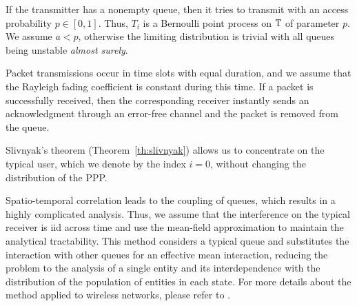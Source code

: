 If the transmitter has a nonempty queue, then it tries to transmit with an access probability $p\in[0,1]$. Thus, $T_i$ is a Bernoulli point process on ${\mathbb T}$ of parameter $p$.
%
We assume $a < p$, otherwise the limiting distribution is trivial with all queues being unstable \textit{almost surely}.

Packet transmissions occur in time slots with equal duration, and we assume that the Rayleigh fading coefficient is constant during this time.
%
If a packet is successfully received, then the corresponding receiver instantly sends an acknowledgment through an error-free channel and the packet is removed from the queue.


Slivnyak’s theorem (Theorem~\ref{th:slivnyak}) allows us to concentrate on the typical user, which we denote by the index $i=0$, without changing the distribution of the PPP.

Spatio-temporal correlation leads to the coupling of queues, which results in a highly complicated analysis. Thus, we assume that the interference on the typical receiver is iid across time and use the mean-field approximation \cite{kurtz1981approximation} to maintain the analytical tractability.
%
This method considers a typical queue and substitutes the interaction with other queues for an effective mean interaction, reducing the problem to the analysis of a single entity and its interdependence with the distribution of the population of entities in each state.
%
{For more details about the method applied to wireless networks, please refer to} \cite[Page~28]{haenggi2021stochastic}.

